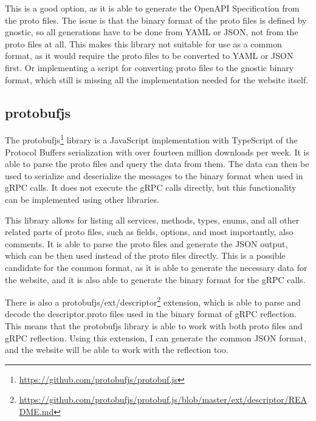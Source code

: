 This is a good option, as it is able to generate the OpenAPI Specification from the proto files.
The issue is that the binary format of the proto files is defined by gnostic, so all generations have to be done from YAML or JSON, not from the proto files at all.
This makes this library not suitable for use as a common format, as it would require the proto files to be converted to YAML or JSON first.
Or implementing a script for converting proto files to the gnostic binary format, which still is missing all the implementation needed for the website itself.


\subsection{protobufjs}
The protobufjs\footnote{\url{https://github.com/protobufjs/protobuf.js}} library is a JavaScript implementation with TypeScript of the Protocol Buffers serialization with over fourteen million downloads per week.
It is able to parse the proto files and query the data from them.
The data can then be used to serialize and deserialize the messages to the binary format when used in gRPC calls.
It does not execute the gRPC calls directly, but this functionality can be implemented using other libraries.
\cite{protobufjs}

This library allows for listing all services, methods, types, enums, and all other related parts of proto files, such as fields, options, and most importantly, also comments.
It is able to parse the proto files and generate the JSON output, which can be then used instead of the proto files directly.
This is a possible candidate for the common format, as it is able to generate the necessary data for the website, and it is also able to generate the binary format for the gRPC calls.

There is also a protobufjs/ext/descriptor\footnote{\url{https://github.com/protobufjs/protobuf.js/blob/master/ext/descriptor/README.md}} extension, which is able to parse and decode the descriptor.proto files used in the binary format of gRPC reflection.
This means that the protobufjs library is able to work with both proto files and gRPC reflection.
Using this extension, I can generate the common JSON format, and the website will be able to work with the reflection too.

